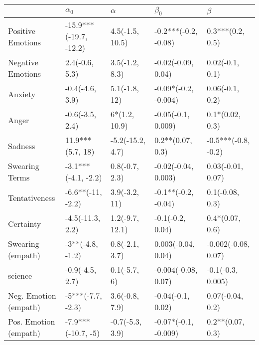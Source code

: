 \begin{tabular}{lllll}
\toprule
{} &              $\alpha_0$ &          $\alpha$ &             $\beta_0$ &              $\beta$ \\
\midrule
Positive Emotions     &  -15.9***(-19.7, -12.2) &   4.5(-1.5, 10.5) &  -0.2***(-0.2, -0.08) &     0.3***(0.2, 0.5) \\
Negative Emotions     &          2.4(-0.6, 5.3) &    3.5(-1.2, 8.3) &    -0.02(-0.09, 0.04) &      0.02(-0.1, 0.1) \\
Anxiety               &         -0.4(-4.6, 3.9) &     5.1(-1.8, 12) &  -0.09*(-0.2, -0.004) &      0.06(-0.1, 0.2) \\
Anger                 &         -0.6(-3.5, 2.4) &     6*(1.2, 10.9) &    -0.05(-0.1, 0.009) &      0.1*(0.02, 0.3) \\
Sadness               &        11.9***(5.7, 18) &  -5.2(-15.2, 4.7) &      0.2**(0.07, 0.3) &  -0.5***(-0.8, -0.2) \\
Swearing Terms        &     -3.1***(-4.1, -2.2) &    0.8(-0.7, 2.3) &   -0.02(-0.04, 0.003) &    0.03(-0.01, 0.07) \\
Tentativeness         &       -6.6**(-11, -2.2) &     3.9(-3.2, 11) &   -0.1**(-0.2, -0.04) &      0.1(-0.08, 0.3) \\
Certainty             &        -4.5(-11.3, 2.2) &   1.2(-9.7, 12.1) &      -0.1(-0.2, 0.04) &      0.4*(0.07, 0.6) \\
Swearing (empath)     &        -3**(-4.8, -1.2) &    0.8(-2.1, 3.7) &    0.003(-0.04, 0.04) &  -0.002(-0.08, 0.07) \\
science               &         -0.9(-4.5, 2.7) &      0.1(-5.7, 6) &   -0.004(-0.08, 0.07) &    -0.1(-0.3, 0.005) \\
Neg. Emotion (empath) &       -5***(-7.7, -2.3) &    3.6(-0.8, 7.9) &     -0.04(-0.1, 0.02) &     0.07(-0.04, 0.2) \\
Pos. Emotion (empath) &      -7.9***(-10.7, -5) &   -0.7(-5.3, 3.9) &  -0.07*(-0.1, -0.009) &     0.2**(0.07, 0.3) \\
\bottomrule
\end{tabular}
